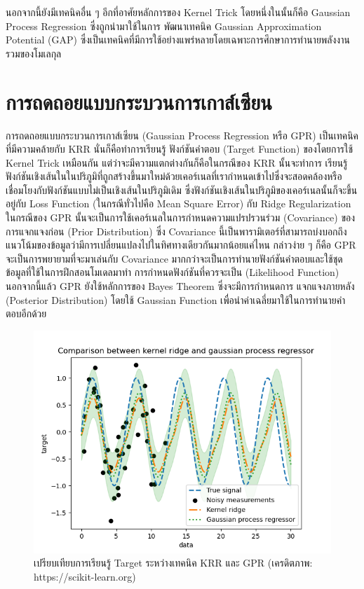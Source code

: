 นอกจากนี้ยังมีเทคนิคอื่น ๆ อีกที่อาศัยหลักการของ Kernel Trick โดยหนึ่งในนั้นก็คือ Gaussian Process Regression ซึ่งถูกนำมาใช้ในการ%
พัฒนาเทคนิค Gaussian Approximation Potential (GAP) ซึ่งเป็นเทคนิคที่มีการใช้อย่างแพร่หลายโดยเฉพาะการศึกษาการทำนายพลังงาน%
รวมของโมเลกุล\autocite{bartok2010,bartok2015}

\section{การถดถอยแบบกระบวนการเกาส์เซียน}
\label{sec:gaussian_process}

การถดถอยแบบกระบวนการเกาส์เซียน (Gaussian Process Regression หรือ GPR) เป็นเทคนิคที่มีความคล้ายกับ KRR นั่นก็คือทำการเรียนรู้
ฟังก์ชันคำตอบ (Target Function) ของโดยการใช้ Kernel Trick เหมือนกัน แต่ว่าจะมีความแตกต่างกันก็คือในกรณีของ KRR นั้นจะทำการ%
เรียนรู้ฟังก์ชันเชิงเส้นในในปริภูมิที่ถูกสร้างขึ้นมาใหม่ด้วยเคอร์เนลที่เรากำหนดเข้าไปซึ่งจะสอดคล้องหรือเชื่อมโยงกับฟังก์ชันแบบไม่เป็นเชิงเส้นในปริภูมิเดิม 
ซึ่งฟังก์ชันเชิงเส้นในปริภูมิของเคอร์เนลนั้นก็จะขึ้นอยู่กับ Loss Function (ในกรณีทั่วไปคือ Mean Square Error) กับ Ridge Regularization 
ในกรณีของ GPR นั้นจะเป็นการใช้เคอร์เนลในการกำหนดความแปรปรวนร่วม (Covariance) ของการแจกแจงก่อน (Prior Distribution) 
ซึ่ง Covariance นี้เป็นพารามิเตอร์ที่สามารถบ่งบอกถึงแนวโน้มของข้อมูลว่ามีการเปลี่ยนแปลงไปในทิศทางเดียวกันมากน้อยแค่ไหน กล่าวง่าย ๆ 
ก็คือ GPR จะเป็นการพยายามที่จะมาเล่นกับ Covariance มากกว่าจะเป็นการทำนายฟังก์ชันคำตอบและใช้ชุดข้อมูลที่ใช้ในการฝึกสอนโมเดลมาทำ%
การกำหนดฟังก์ชันที่ควรจะเป็น (Likelihood Function) นอกจากนี้แล้ว GPR ยังใช้หลักการของ Bayes Theorem ซึ่งจะมีการกำหนดการ%
แจกแจงภายหลัง (Posterior Distribution) โดยใช้ Gaussian Function เพื่อนำค่าเฉลี่ยมาใช้ในการทำนายคำตอบอีกด้วย

\begin{figure}[H]
    \centering
    \includegraphics[width=0.9\linewidth]{fig/plot_gpr_kernel.png}
    \caption{เปรียบเทียบการเรียนรู้ Target ระหว่างเทคนิค KRR และ GPR (เครดิตภาพ: https://scikit-learn.org)}
    \label{fig:krr_gpr}
\end{figure}

